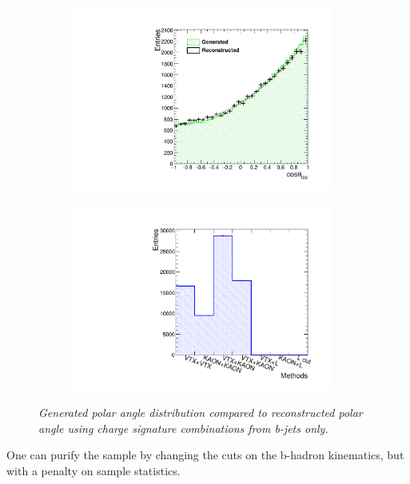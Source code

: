 \begin{figure}[h]
	\centering
	\begin{subfigure}{0.5\textwidth}
		\includegraphics[width=0.95\textwidth]{ILD/plots/top-asymmetry-bonly-gcut.pdf}
		\caption{\label{fig:TopAsymmetryNoCutBjet_a_3} }
	\end{subfigure}%
	\begin{subfigure}{0.5\textwidth}
		\centering
		\includegraphics[width=0.95\textwidth]{ILD/plots/top-methods-bonly-gcut.pdf}
		\caption{\label{fig:TopAsymmetryNoCutBjet_b_3} }
	\end{subfigure}
	\caption{\sl Generated polar angle distribution compared to reconstructed polar angle using charge signature combinations from b-jets only. }
	\label{fig:TopAsymmetryNoCutBjet_3}
\end{figure}

One can purify the sample by changing the cuts on the b-hadron kinematics, but with a penalty on sample statistics. 


